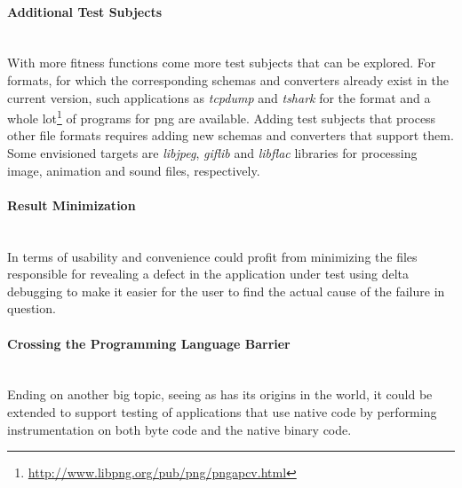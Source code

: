 \paragraph{Additional Test Subjects} ~\\
With more fitness functions come more test subjects that can be explored. For formats, for which the
corresponding schemas and converters already exist in the current version, such applications as \emph{tcpdump}
and \emph{tshark} for the \pcap format and a whole
lot\footnote{\url{http://www.libpng.org/pub/png/pngapcv.html}} of programs for {\small png} are available.
Adding test subjects that process other file formats requires adding new schemas and converters that
support them. Some envisioned targets are \emph{libjpeg}, \emph{giflib} and \emph{libflac} libraries for
processing image, animation and sound files, respectively.
\paragraph{Result Minimization} ~\\
In terms of usability and convenience \xmlmate could profit from minimizing the files responsible for
revealing a defect in the application under test using delta debugging\cite{zeller2002simplifying} to make it
easier for the user to find the actual cause of the failure in question.
\paragraph{Crossing the Programming Language Barrier} ~\\
Ending on another big topic, seeing as \xmlmate has its origins in the \java world, it could be extended
to support testing of \java applications that use native code by performing instrumentation on both \java
byte code and the native binary code. 

{\color{white}{Thank you for reading the digital version and not printing this out on paper! :)}}